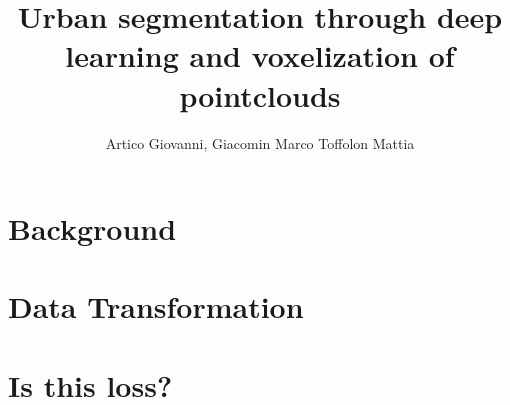 \documentclass[letterpaper]{article} %
\title{Urban segmentation through deep learning and voxelization of pointclouds}
\author{
    Artico Giovanni\equalcontrib,
    Giacomin Marco\equalcontrib
    Toffolon Mattia\equalcontrib
}
\begin{document}
\maketitle

\section{Background}

\section{Data Transformation}

\section{Is this loss?}


%
%
%
%
%
%
%
%
%
%
%
%
%
\nocite{*}
\newpage

\end{document}
